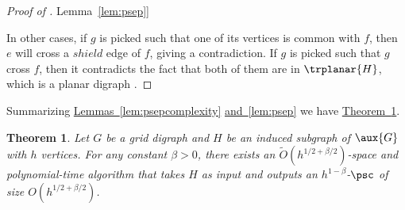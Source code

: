\documentclass[11pt]{article}
\numberwithin{equation}{section}
\newtheorem{theorem}{Theorem}[section]
\theoremstyle{definition}
\theoremstyle{plain}
\newcommand{\expref}[2]{\hyperref[#2]{#1~\ref{#2}}}
\begin{document}
\begin{proof}[Proof of \expref{Lemma}{lem:psep}]
\begin{description}
\begin{description}
\end{description}
\end{description}
In other cases, if $g$ is picked such that one of its vertices is common with $f$, then $e$ will cross a $shield$ edge of $f$, giving a contradiction. If $g$ is picked such that $g$ cross $f$, then it contradicts the fact that both of them are %
 in $\trplanar{H}$, which is a planar %
digraph %
.
\end{proof}
Summarizing \expref{Lemmas}{lem:psepcomplexity} \expref{and}{lem:psep} we have \expref{Theorem}{thm:constructpsc}.
\begin{theorem} \label{thm:constructpsc}
Let $G$ be a grid %
digraph %
 and $H$ be %
an%
induced subgraph of $\aux{G}$ with $h$ vertices. For any constant $\beta > 0$, there exists an $\tilde{O}(h^{1/2 + \beta/2})$-space and polynomial-time %
algorithm that takes $H$ as input and outputs an $h^{1-\beta}$-$\psc$ of size $O(h^{1/2 + \beta/2})$.
\end{theorem}

%
\end{document}
